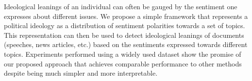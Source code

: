 Ideological leanings of an individual can often be gauged by the sentiment one expresses about different issues. We propose a simple framework that represents a political ideology as a distribution of sentiment polarities towards a set of topics. This representation can then be used to detect ideological leanings of documents (speeches, news articles, etc.) based on the sentiments expressed towards different topics. Experiments performed using a widely used dataset show the promise of our proposed approach that achieves comparable performance to other methods despite being much simpler and more interpretable.
